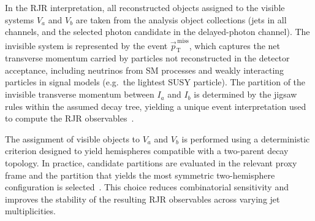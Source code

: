In the RJR interpretation, all reconstructed objects assigned to the visible systems $V_a$ and $V_b$ are taken from the analysis object collections (jets in all channels, and the selected photon candidate in the delayed-photon channel). The invisible system is represented by the event $\vec{p}_{\mathrm{T}}^{\,\text{miss}}$, which captures the net transverse momentum carried by particles not reconstructed in the detector acceptance, including neutrinos from SM processes and weakly interacting particles in signal models (e.g.\ the lightest SUSY particle). The partition of the invisible transverse momentum between $I_a$ and $I_b$ is determined by the jigsaw rules within the assumed decay tree, yielding a unique event interpretation used to compute the RJR observables~\cite{Jackson_2017_RJR}.

The assignment of visible objects to $V_a$ and $V_b$ is performed using a deterministic criterion designed to yield hemispheres compatible with a two-parent decay topology. In practice, candidate partitions are evaluated in the relevant proxy frame and the partition that yields the most symmetric two-hemisphere configuration is selected~\cite{ATLAS_2018_RJR_JetMET_36fb}. This choice reduces combinatorial sensitivity and improves the stability of the resulting RJR observables across varying jet multiplicities.




